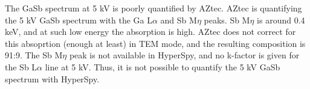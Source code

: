 The GaSb spectrum at 5 kV is poorly quantified by AZtec.
AZtec is quantifying the 5 kV GaSb spectrum with the Ga L$\alpha$ and Sb M$\eta$ peaks.
Sb M$\eta$ is around 0.4 keV, and at such low energy the absorption is high.
AZtec does not correct for this absoprtion (enough at least) in TEM mode, and the resulting composition is 91:9.
The Sb M$\eta$ peak is not available in HyperSpy, and no k-factor is given for the Sb L$\alpha$ line at 5 kV.
Thus, it is not possible to quantify the 5 kV GaSb spectrum with HyperSpy.


